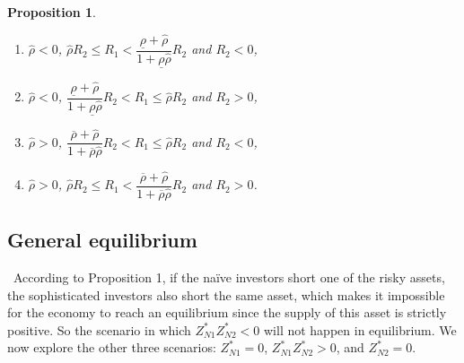 \documentclass[10pt]{article}
\newtheorem{prop}{Proposition}
\begin{document}
\begin{prop}
\begin{enumerate}
\item [(1).] $ \hat{\rho} < 0 $, $ \hat{\rho} R_2 \leqslant R_1 < \dfrac{\underline{\rho} + {\hat \rho}}{1 + \underline{\rho} {\hat \rho}} R_2 $ and $ R_2 < 0 $,
\item [(2).] $ \hat{\rho} < 0 $, $ \dfrac{\underline{\rho} + {\hat \rho}}{1 + \underline{\rho} {\hat \rho}} R_2 < R_1 \leqslant \hat{\rho} R_2 $ and $ R_2 > 0 $, 
\item [(3).] $ \hat{\rho} > 0 $, $ \dfrac{\overline{\rho} + {\hat \rho}}{1 + \overline{\rho} {\hat \rho}} R_2 < R_1 \leqslant \hat{\rho} R_2 $ and $ R_2 < 0 $,
\item [(4).] $ \hat{\rho} > 0 $, $ \hat{\rho} R_2 \leqslant R_1 < \dfrac{\overline{\rho} + {\hat \rho}}{1 + \overline{\rho} {\hat \rho}} R_2 $ and $ R_2 > 0 $.
\end{enumerate}
\end{prop}
	
\subsection{General equilibrium}

\quad \ 
According to Proposition 1, if the na\"ive investors short one of the risky assets, the sophisticated investors also short the same asset, which makes it impossible for the economy to reach an equilibrium since the supply of this asset is strictly positive. So the scenario in which $ Z_{N 1}^* Z_{N 2}^* < 0 $ will not happen in equilibrium. We now explore the other three scenarios: $ Z_{N 1}^* = 0 $, $ Z_{N 1}^* Z_{N 2}^* > 0 $, and $ Z_{N 2}^* = 0 $.
\end{document}

